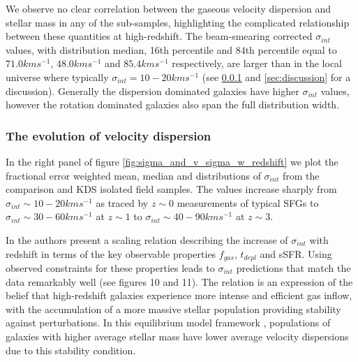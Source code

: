 \documentclass[fleqn,usenatbib]{mn2e}
\begin{document}
We observe no clear correlation between the gaseous velocity dispersion and stellar mass in any of the sub-samples, highlighting the complicated relationship between these quantities at high-redshift.
The beam-smearing corrected $\sigma_{int}$ values, with distribution median, 16th percentile and 84th percentile equal to $71.0kms^{-1}$, $48.0kms^{-1}$ and $85.4kms^{-1}$ respectively, are larger than in the local universe where typically $\sigma_{int} = 10-20kms^{-1}$ \citep{Epinat2008a} (see \cref{subsubsec:sigma_evolution} and \cref{sec:discussion} for a discussion).
Generally the dispersion dominated galaxies have higher $\sigma_{int}$ values, however the rotation dominated galaxies also span the full distribution width.

\subsubsection{The evolution of velocity dispersion}\label{subsubsec:sigma_evolution}

In the right panel of figure \ref{fig:sigma_and_v_sigma_w_redshift} we plot the fractional error weighted mean, median and distributions of $\sigma_{int}$ from the comparison and KDS isolated field samples.
The values increase sharply from $\sigma_{int} \sim 10-20kms^{-1}$ as traced by $z\sim0$ measurements of typical SFGs to $\sigma_{int} \sim 30-60kms^{-1}$ at $z\sim1$ to $\sigma_{int} \sim 40-90kms^{-1}$ at $z\sim3$.

In \cite{Wisnioski2015} the authors present a scaling relation describing the increase of $\sigma_{int}$ with redshift in terms of the key observable properties $f_{gas}$, $t_{depl}$ and sSFR.
Using observed constraints for these properties \citep{Tacconi2013,Tacconi2017} leads to $\sigma_{int}$ predictions that match the data remarkably well (see \cite{Wisnioski2015} figures 10 and 11).
The relation is an expression of the belief that high-redshift galaxies experience more intense and efficient gas inflow, with the accumulation of a more massive stellar population providing stability against perturbations.
In this equilibrium model framework \citep[e.g.][]{Dave2012,Lilly2013,Saintonge2013}, populations of galaxies with higher average stellar mass have lower average velocity dispersions due to this stability condition.  \\
\end{document}
